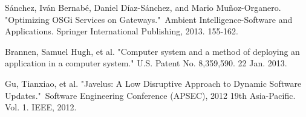 \documentclass[conference]{IEEEtran}
\begin{document}
\begin{thebibliography}{9}
Sánchez, Iván Bernabé, Daniel Díaz-Sánchez, and Mario Muñoz-Organero. "Optimizing OSGi Services on Gateways." Ambient Intelligence-Software and Applications. Springer International Publishing, 2013. 155-162.

Brannen, Samuel Hugh, et al. "Computer system and a method of deploying an application in a computer system." U.S. Patent No. 8,359,590. 22 Jan. 2013.

Gu, Tianxiao, et al. "Javelus: A Low Disruptive Approach to Dynamic Software Updates." Software Engineering Conference (APSEC), 2012 19th Asia-Pacific. Vol. 1. IEEE, 2012.

\end{thebibliography}


\end{document}
